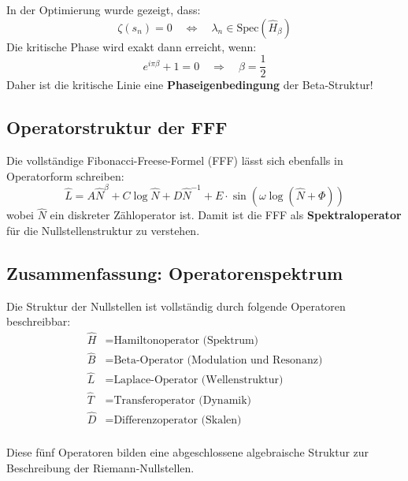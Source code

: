 In der Optimierung wurde gezeigt, dass:
\[
\zeta(s_n) = 0 \quad \Leftrightarrow \quad \lambda_n \in \text{Spec}(\hat{H}_\beta)
\]
Die kritische Phase wird exakt dann erreicht, wenn:
\[
e^{i \pi \beta} + 1 = 0
\quad \Rightarrow \quad \beta = \frac{1}{2}
\]
Daher ist die kritische Linie eine \textbf{Phaseigenbedingung} der Beta-Struktur!

\subsection{Operatorstruktur der FFF}

Die vollständige Fibonacci-Freese-Formel (FFF) lässt sich ebenfalls in Operatorform schreiben:
\[
\hat{L} = A \hat{N}^\beta + C \log \hat{N} + D \hat{N}^{-1} + E \cdot \sin(\omega \log(\hat{N} + \Phi))
\]
wobei \(\hat{N}\) ein diskreter Zähloperator ist. Damit ist die FFF als \textbf{Spektraloperator} für die Nullstellenstruktur zu verstehen.

\subsection{Zusammenfassung: Operatorenspektrum}

Die Struktur der Nullstellen ist vollständig durch folgende Operatoren beschreibbar:
\begin{align*}
\hat{H} &= \text{Hamiltonoperator (Spektrum)} \\
\hat{B} &= \text{Beta-Operator (Modulation und Resonanz)} \\
\hat{L} &= \text{Laplace-Operator (Wellenstruktur)} \\
\hat{T} &= \text{Transferoperator (Dynamik)} \\
\hat{D} &= \text{Differenzoperator (Skalen)} \\
\end{align*}

Diese fünf Operatoren bilden eine abgeschlossene algebraische Struktur zur Beschreibung der Riemann-Nullstellen.